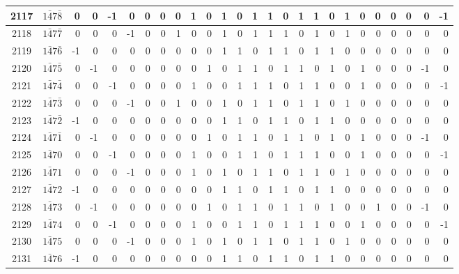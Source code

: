 \documentclass[12 pt]{article}%
\begin{document}
\begin{tiny}
\begin{centering}
\begin{longtable}{|c|c||rrrrrrrrrrrrrrrrrrrrrrrr|}
      \hline
      2117 & $1\bar47\bar8$ & 0 & 0 & -1 & 0 & 0 & 0 & 0 & 1 & 0 & 1 & 0 & 1 & 1 & 0 & 1 & 1 & 0 & 1 & 0 & 0 & 0 & 0 & 0 & -1 \\
      \hline
      2118 & $1\bar47\bar7$ & 0 & 0 & 0 & -1 & 0 & 0 & 1 & 0 & 0 & 1 & 0 & 1 & 1 & 1 & 0 & 1 & 0 & 1 & 0 & 0 & 0 & 0 & 0 & 0 \\
      \hline
      2119 & $1\bar47\bar6$ & -1 & 0 & 0 & 0 & 0 & 0 & 0 & 0 & 0 & 1 & 1 & 0 & 1 & 1 & 0 & 1 & 1 & 0 & 0 & 0 & 0 & 0 & 0 & 0 \\
      \hline
      2120 & $1\bar47\bar5$ & 0 & -1 & 0 & 0 & 0 & 0 & 0 & 0 & 1 & 0 & 1 & 1 & 0 & 1 & 1 & 0 & 1 & 0 & 1 & 0 & 0 & 0 & -1 & 0 \\
      \hline
      2121 & $1\bar47\bar4$ & 0 & 0 & -1 & 0 & 0 & 0 & 0 & 1 & 0 & 0 & 1 & 1 & 1 & 0 & 1 & 1 & 0 & 0 & 1 & 0 & 0 & 0 & 0 & -1 \\
      \hline
      2122 & $1\bar47\bar3$ & 0 & 0 & 0 & -1 & 0 & 0 & 1 & 0 & 0 & 1 & 0 & 1 & 1 & 0 & 1 & 1 & 0 & 1 & 0 & 0 & 0 & 0 & 0 & 0 \\
      \hline
      2123 & $1\bar47\bar2$ & -1 & 0 & 0 & 0 & 0 & 0 & 0 & 0 & 0 & 1 & 1 & 0 & 1 & 1 & 0 & 1 & 1 & 0 & 0 & 0 & 0 & 0 & 0 & 0 \\
      \hline
      2124 & $1\bar47\bar1$ & 0 & -1 & 0 & 0 & 0 & 0 & 0 & 0 & 1 & 0 & 1 & 1 & 0 & 1 & 1 & 0 & 1 & 0 & 1 & 0 & 0 & 0 & -1 & 0 \\
      \hline
      2125 & $1\bar470$ & 0 & 0 & -1 & 0 & 0 & 0 & 0 & 1 & 0 & 0 & 1 & 1 & 0 & 1 & 1 & 1 & 0 & 0 & 1 & 0 & 0 & 0 & 0 & -1 \\
      \hline
      2126 & $1\bar471$ & 0 & 0 & 0 & -1 & 0 & 0 & 0 & 1 & 0 & 1 & 0 & 1 & 1 & 0 & 1 & 1 & 0 & 1 & 0 & 0 & 0 & 0 & 0 & 0 \\
      \hline
      2127 & $1\bar472$ & -1 & 0 & 0 & 0 & 0 & 0 & 0 & 0 & 0 & 1 & 1 & 0 & 1 & 1 & 0 & 1 & 1 & 0 & 0 & 0 & 0 & 0 & 0 & 0 \\
      \hline
      2128 & $1\bar473$ & 0 & -1 & 0 & 0 & 0 & 0 & 0 & 0 & 1 & 0 & 1 & 1 & 0 & 1 & 1 & 0 & 1 & 0 & 0 & 1 & 0 & 0 & -1 & 0 \\
      \hline
      2129 & $1\bar474$ & 0 & 0 & -1 & 0 & 0 & 0 & 0 & 1 & 0 & 0 & 1 & 1 & 0 & 1 & 1 & 1 & 0 & 0 & 1 & 0 & 0 & 0 & 0 & -1 \\
      \hline
      2130 & $1\bar475$ & 0 & 0 & 0 & -1 & 0 & 0 & 0 & 1 & 0 & 1 & 0 & 1 & 1 & 0 & 1 & 1 & 0 & 1 & 0 & 0 & 0 & 0 & 0 & 0 \\
      \hline
      2131 & $1\bar476$ & -1 & 0 & 0 & 0 & 0 & 0 & 0 & 0 & 0 & 1 & 1 & 0 & 1 & 1 & 0 & 1 & 1 & 0 & 0 & 0 & 0 & 0 & 0 & 0 \\

\end{longtable}
\end{centering}
\end{tiny}
\end{document}

